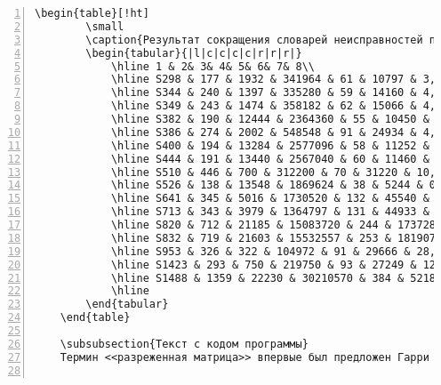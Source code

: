 \documentclass[bachelor, och, pract]{SCWorks}
\begin{document}
\begin{Verbatim}[fontsize=\small, numbers=left]
	\begin{table}[!ht]
		\small
		\caption{Результат сокращения словарей неисправностей при помощи масок} \label{table-1}
		\begin{tabular}{|l|c|c|c|c|r|r|r|}
			\hline 1 & 2& 3& 4& 5& 6& 7& 8\\
			\hline S298 & 177 & 1932 & 341964 & 61 & 10797 & 3,16\% & 0,61\\
			\hline S344 & 240 & 1397 & 335280 & 59 & 14160 & 4,22\% & 0,53\\
			\hline S349 & 243 & 1474 & 358182 & 62 & 15066 & 4,21\% & 0,60\\
			\hline S382 & 190 & 12444 & 2364360 & 55 & 10450 & 0,44\% & 3,78\\
			\hline S386 & 274 & 2002 & 548548 & 91 & 24934 & 4,55\% & 1,40\\
			\hline S400 & 194 & 13284 & 2577096 & 58 & 11252 & 0,44\% & 4,28\\
			\hline S444 & 191 & 13440 & 2567040 & 60 & 11460 & 0,45\% & 4,26\\
			\hline S510 & 446 & 700 & 312200 & 70 & 31220 & 10,00\% & 0,63\\
			\hline S526 & 138 & 13548 & 1869624 & 38 & 5244 & 0,28\% & 2,41\\
			\hline S641 & 345 & 5016 & 1730520 & 132 & 45540 & 2,63\% & 7,06\\
			\hline S713 & 343 & 3979 & 1364797 & 131 & 44933 & 3,29\% & 5,61\\
			\hline S820 & 712 & 21185 & 15083720 & 244 & 173728 & 1,15\% & 126,99\\
			\hline S832 & 719 & 21603 & 15532557 & 253 & 181907 & 1,17\% & 135,18\\
			\hline S953 & 326 & 322 & 104972 & 91 & 29666 & 28,26\% & 0,27\\
			\hline S1423 & 293 & 750 & 219750 & 93 & 27249 & 12,40\% & 0,57\\
			\hline S1488 & 1359 & 22230 & 30210570 & 384 & 521856 & 1,73\% & 541,69\\
			\hline
		\end{tabular}
	\end{table}
	
	\subsubsection{Текст с кодом программы}
	Термин <<разреженная матрица>> впервые был предложен Гарри Марковицем. В 1989 он был награжден премией имени Джона фон Неймана в том числе и за вклад в теорию методов для разреженных матриц.
	

\end{Verbatim}
\end{document}
